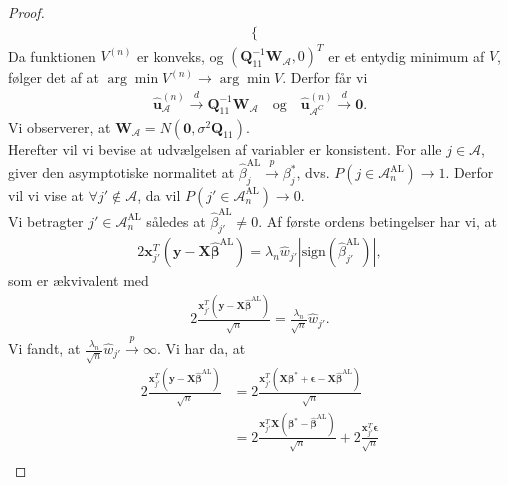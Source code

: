 \begin{proof}
\begin{align*}
\begin{cases}
  \end{cases}
\end{align*}
Da funktionen $V^{(n)}$ er konveks, og $(\mathbf{Q}_{11}^{-1} \mathbf{W_\mathcal{A}},0)^T$ er et entydig minimum af $V$, følger det af \cite{Zou} at 
$\arg\min V^{(n)} \rightarrow \arg\min V$.
Derfor får vi
\begin{align}
\hat{\mathbf{u}}_\mathcal{A}^{(n)} \overset{d}{\rightarrow} \mathbf{Q}_{11}^{-1} \mathbf{W}_\mathcal{A} \quad \text{og} \quad \hat{\mathbf{u}}_{\mathcal{A}^C}^{(n)} \overset{d}{\rightarrow} \mathbf{0}. \label{eq:minUA}
\end{align}
Vi observerer, at $\mathbf{W}_\mathcal{A}=N(\mathbf{0}, \sigma^2 \mathbf{Q}_{11})$. \\

Herefter vil vi bevise at udvælgelsen af variabler er konsistent. For alle $j \in \mathcal{A}$, giver den asymptotiske normalitet at $\hat{\beta}_j^{\text{AL}} \overset{p}{\rightarrow}\beta_j^{*}$, dvs. $P(j \in \mathcal{A}_n^{\text{AL}}) \rightarrow 1$. Derfor vil vi vise at $\forall j' \notin \mathcal{A}$, da vil $P(j' \in \mathcal{A}_n^{\text{AL}}) \rightarrow 0$. \\
Vi betragter $j' \in \mathcal{A}_n^{\text{AL}}$ således at $\hat{\beta}_{j'}^{\text{AL}} \neq 0$. Af første ordens betingelser har vi, at 
\begin{align*}
2 \mathbf{x}_{j'}^T  \left( \mathbf{y}-\mathbf{X}\hat{\boldsymbol{\beta}}^{\text{AL}} \right)=\lambda_n \hat{w}_{j'} \left\vert \text{sign}(\hat{\beta}_{j'}^\text{AL}) \right\vert,
\end{align*}
som er ækvivalent med
\begin{align*}
2 \frac{\mathbf{x}_{j'}^T \left( \mathbf{y}-\mathbf{X}\hat{\boldsymbol{\beta}}^{{\text{AL}}}\right)}{\sqrt{n}}=\frac{\lambda_n}{\sqrt{n}} \hat{w}_{j'}.
\end{align*}
Vi fandt, at $\frac{\lambda_n}{\sqrt{n}} \hat{w}_{j'} \overset{p}{\rightarrow} \infty$. Vi har da, at 
\begin{align*}
2 \frac{\mathbf{x}_{j'}^T \left(\mathbf{y}-\mathbf{X}\hat{\boldsymbol{\beta}}^{{\text{AL}}} \right)}{\sqrt{n}}
 &= 2 \frac{\mathbf{x}_{j'}^T \left(\mathbf{X}\boldsymbol{\beta}^*+\boldsymbol{\epsilon}-\mathbf{X}\hat{\boldsymbol{\beta}}^{{\text{AL}}} \right) }{\sqrt{n}} \\
&= 2 \frac{\mathbf{x}_{j'}^T \mathbf{X} \left(\boldsymbol{\beta}^*-\hat{\boldsymbol{\beta}}^{\text{AL}} \right)}{\sqrt{n}}+2\frac{\mathbf{x}_{j'}^T \boldsymbol{\epsilon}}{\sqrt{n}} \\

\end{align*}
\end{proof}

